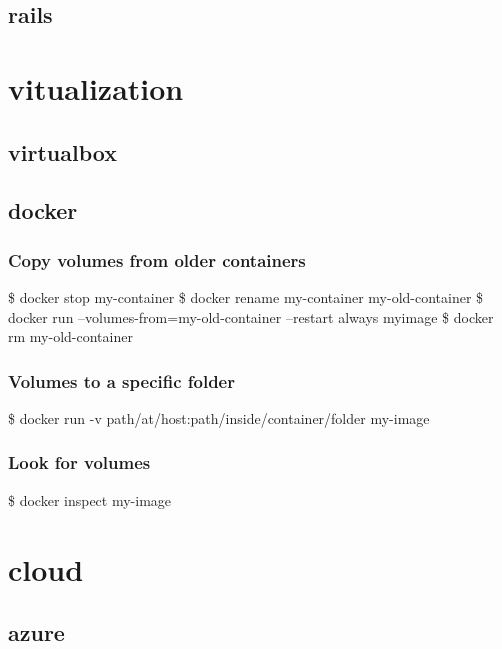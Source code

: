 \documentclass{report}
\begin{document}
\section{rails}

\chapter{vitualization}
\section{virtualbox}
\section{docker}
\subsection{Copy volumes from older containers}
\begin{displayquote}
\$ docker stop my-container \newline
\$ docker rename my-container my-old-container \newline
\$ docker run --volumes-from=my-old-container --restart always myimage \newline
\$ docker rm my-old-container
\end{displayquote}
\subsection{Volumes to a specific folder}
\begin{displayquote}
\$ docker run -v path/at/host:path/inside/container/folder my-image \newline
\end{displayquote}
\subsection{Look for volumes}
\begin{displayquote}
\$ docker inspect my-image \newline
\end{displayquote}


\chapter{cloud}
\section{azure}
\end{document}
